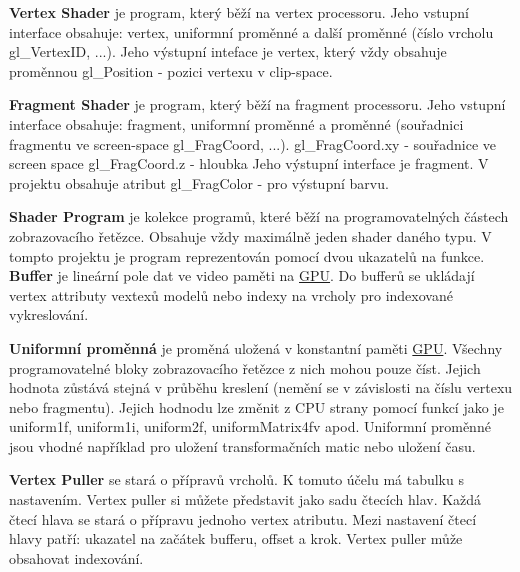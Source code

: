 {\bfseries Vertex Shader} je program, který běží na vertex processoru. Jeho vstupní interface obsahuje\+: vertex, uniformní proměnné a další proměnné (číslo vrcholu gl\+\_\+\+Vertex\+ID, ...). Jeho výstupní inteface je vertex, který vždy obsahuje proměnnou gl\+\_\+\+Position -\/ pozici vertexu v clip-\/space.

{\bfseries Fragment Shader} je program, který běží na fragment processoru. Jeho vstupní interface obsahuje\+: fragment, uniformní proměnné a proměnné (souřadnici fragmentu ve screen-\/space gl\+\_\+\+Frag\+Coord, ...). gl\+\_\+\+Frag\+Coord.\+xy -\/ souřadnice ve screen space gl\+\_\+\+Frag\+Coord.\+z -\/ hloubka Jeho výstupní interface je fragment. V projektu obsahuje atribut gl\+\_\+\+Frag\+Color -\/ pro výstupní barvu.

{\bfseries Shader Program} je kolekce programů, které běží na programovatelných částech zobrazovacího řetězce. Obsahuje vždy maximálně jeden shader daného typu. V tompto projektu je program reprezentován pomocí dvou ukazatelů na funkce.  {\bfseries Buffer} je lineární pole dat ve video paměti na \hyperlink{structGPU}{G\+PU}. Do bufferů se ukládají vertex attributy vextexů modelů nebo indexy na vrcholy pro indexované vykreslování.

{\bfseries Uniformní proměnná} je proměná uložená v konstantní paměti \hyperlink{structGPU}{G\+PU}. Všechny programovatelné bloky zobrazovacího řetězce z nich mohou pouze číst. Jejich hodnota zůstává stejná v průběhu kreslení (nemění se v závislosti na číslu vertexu nebo fragmentu). Jejich hodnodu lze změnit z C\+PU strany pomocí funkcí jako je uniform1f, uniform1i, uniform2f, uniform\+Matrix4fv apod. Uniformní proměnné jsou vhodné například pro uložení transformačních matic nebo uložení času.

{\bfseries Vertex Puller} se stará o přípravů vrcholů. K tomuto účelu má tabulku s nastavením. Vertex puller si můžete představit jako sadu čtecích hlav. Každá čtecí hlava se stará o přípravu jednoho vertex atributu. Mezi nastavení čtecí hlavy patří\+: ukazatel na začátek bufferu, offset a krok. Vertex puller může obsahovat indexování.

